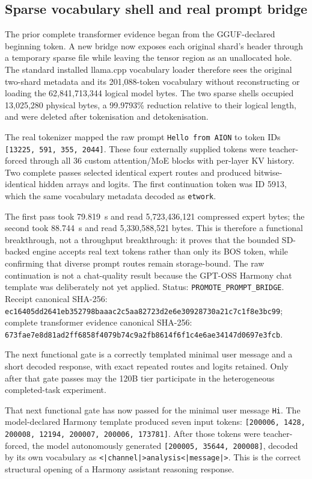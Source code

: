 \subsection{Sparse vocabulary shell and real prompt bridge}
The prior complete transformer evidence began from the GGUF-declared beginning
token. A new bridge now exposes each original shard's header through a
temporary sparse file while leaving the tensor region as an unallocated hole.
The standard installed llama.cpp vocabulary loader therefore sees the original
two-shard metadata and its 201,088-token vocabulary without reconstructing or
loading the 62,841,713,344 logical model bytes. The two sparse shells occupied
13,025,280 physical bytes, a 99.9793\% reduction relative to their logical
length, and were deleted after tokenisation and detokenisation.

The real tokenizer mapped the raw prompt \texttt{Hello from AION} to token IDs
\texttt{[13225, 591, 355, 2044]}. These four externally supplied tokens were
teacher-forced through all 36 custom attention/MoE blocks with per-layer KV
history. Two complete passes selected identical expert routes and produced
bitwise-identical hidden arrays and logits. The first continuation token was
ID 5913, which the same vocabulary metadata decoded as \texttt{etwork}.

The first pass took 79.819~s and read 5,723,436,121 compressed expert bytes;
the second took 88.744~s and read 5,330,588,521 bytes. This is therefore a
functional breakthrough, not a throughput breakthrough: it proves that the
bounded SD-backed engine accepts real text tokens rather than only its BOS
token, while confirming that diverse prompt routes remain storage-bound. The
raw continuation is not a chat-quality result because the GPT-OSS Harmony chat
template was deliberately not yet applied. Status:
\texttt{PROMOTE\_PROMPT\_BRIDGE}. Receipt canonical SHA-256:
\texttt{ec16405dd2641eb352798baaac2c5aa82723d2e6e30928730a21c7c1f8e3bc99};
complete transformer evidence canonical SHA-256:
\texttt{673fae7e8d81ad2ff6858f4079b74c9a2fb8614f6f1c4e6ae34147d0697e3fcb}.

The next functional gate is a correctly templated minimal user message and a
short decoded response, with exact repeated routes and logits retained. Only
after that gate passes may the 120B tier participate in the heterogeneous
completed-task experiment.

That next functional gate has now passed for the minimal user message
\texttt{Hi}. The model-declared Harmony template produced seven input tokens:
\texttt{[200006, 1428, 200008, 12194, 200007, 200006, 173781]}.
After those tokens were teacher-forced, the model autonomously generated
\texttt{[200005, 35644, 200008]}, decoded by its own vocabulary as
\texttt{<|channel|>analysis<|message|>}. This is the correct structural opening
of a Harmony assistant reasoning response.

